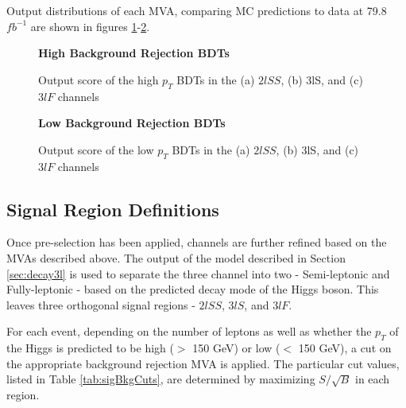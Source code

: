 Output distributions of each MVA, comparing MC predictions to data at 79.8 $fb^{-1}$ are shown in figures \ref{fig:sigBkgScoreHigh}-\ref{fig:sigBkgScoreLow}. 

\begin{figure}
  \centering
  \textbf{High \pt Background Rejection BDTs}
  \\
  \caption{Output score of the high $p_T$ BDTs in the (a) $2lSS$, (b) 3lS, and (c) $3lF$ channels}
  \label{fig:sigBkgScoreHigh}
\end{figure}

\begin{figure}
  \centering
  \textbf{Low \pt Background Rejection BDTs}
  \\
  \label{fig:sigBkgScoreLow}
  \caption{Output score of the low $p_T$ BDTs in the (a) $2lSS$, (b) 3lS, and (c) $3lF$ channels} 
\end{figure}


\subsection{Signal Region Definitions}
\label{subsec:sigRegions}

Once pre-selection has been applied, channels are further refined based on the MVAs described above. The output of the model described in Section \ref{sec:decay3l} is used to separate the three channel into two - Semi-leptonic and Fully-leptonic - based on the predicted decay mode of the Higgs boson. This leaves three orthogonal signal regions - $2lSS$, $3lS$, and $3lF$. 

For each event, depending on the number of leptons as well as whether the $p_T$ of the Higgs is predicted to be high ($>$ 150 GeV) or low ($<$ 150 GeV), a cut on the appropriate background rejection MVA is applied. The particular cut values, listed in Table \ref{tab:sigBkgCuts}, are determined by maximizing $S/\sqrt{B}$ in each region. 

